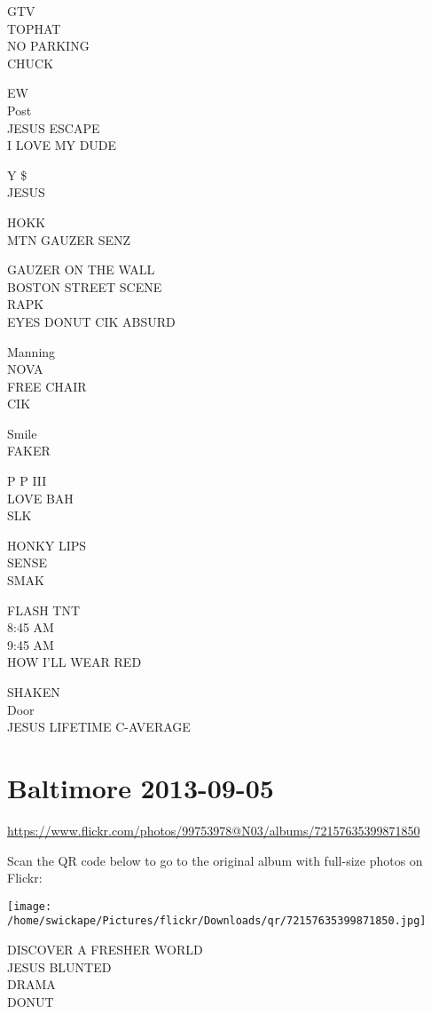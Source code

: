 \documentclass[10pt,letterpaper]{article}
\begin{document}
GTV\\
TOPHAT\\
NO PARKING\\
CHUCK

EW\\
Post\\
JESUS ESCAPE\\
I LOVE MY DUDE

Y \$\\
JESUS

HOKK\\
MTN GAUZER SENZ

GAUZER ON THE WALL\\
BOSTON STREET SCENE\\
RAPK\\
EYES DONUT CIK ABSURD

Manning\\
NOVA\\
FREE CHAIR\\
CIK

Smile\\
FAKER

P P III\\
LOVE BAH\\
SLK

HONKY LIPS\\
SENSE\\
SMAK

FLASH TNT\\
8:45 AM\\
9:45 AM\\
HOW I'LL WEAR RED

SHAKEN\\
Door\\
JESUS LIFETIME C{-}AVERAGE
\pagebreak

\section*{Baltimore 2013-09-05}

\url{https://www.flickr.com/photos/99753978@N03/albums/72157635399871850}

Scan the QR code below to go to the original album with full-size photos on Flickr:

\texttt{[image: /home/swickape/Pictures/flickr/Downloads/qr/72157635399871850.jpg]}
\pagebreak

DISCOVER A FRESHER WORLD\\
JESUS BLUNTED\\
DRAMA\\
DONUT
\end{document}
